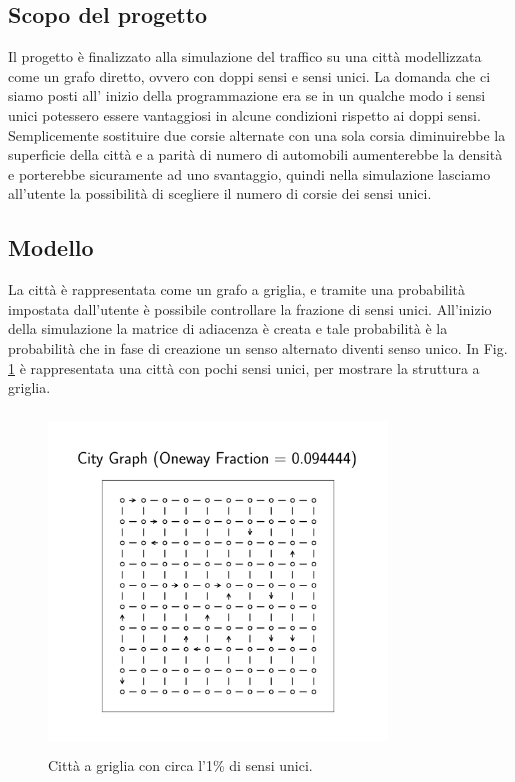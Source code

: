 \documentclass[main.tex]{subfiles}
\begin{document}
\subsection{Scopo del progetto}

Il progetto è finalizzato alla simulazione del traffico su una città modellizzata come un grafo diretto, ovvero con doppi sensi e sensi unici.
La domanda che ci siamo posti all' inizio della programmazione era se in un qualche modo i sensi unici potessero essere vantaggiosi in alcune condizioni
rispetto ai doppi sensi.
Semplicemente sostituire due corsie alternate con una sola corsia diminuirebbe la superficie della città
e a parità di numero di automobili aumenterebbe la densità e porterebbe sicuramente ad uno svantaggio, quindi nella simulazione
lasciamo all'utente la possibilità di scegliere il numero di corsie dei sensi unici.

\subsection{Modello}

La città è rappresentata come un grafo a griglia, e tramite una probabilità impostata dall'utente è possibile controllare la frazione di sensi unici.
All'inizio della simulazione la matrice di adiacenza è creata e tale probabilità è la probabilità che in fase di creazione un senso alternato diventi senso unico.
In Fig. \ref{fig:1} è rappresentata una città con pochi sensi unici, per mostrare la struttura a griglia.

\begin{figure}[H]
    \centering
    \includegraphics[width=9cm, height=9cm]{city.png}
    \caption{Città a griglia con circa l'1\% di sensi unici.}
    \label{fig:1}
\end{figure}
\end{document}
